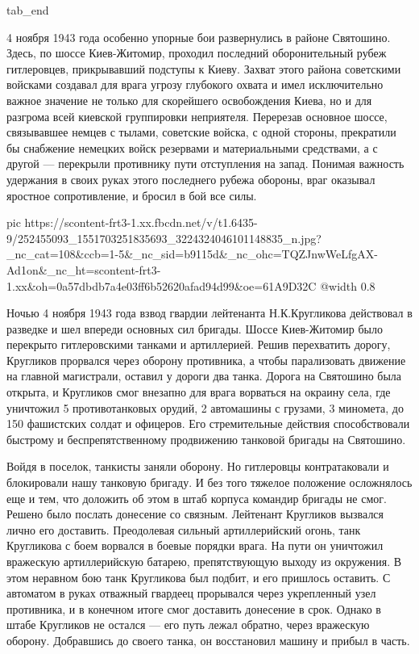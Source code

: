   tab_end
\fi

4 ноября 1943 года особенно упорные бои развернулись в районе Святошино. Здесь,
по шоссе Киев-Житомир, проходил последний оборонительный рубеж гитлеровцев,
прикрывавший подступы к Киеву. Захват этого района советскими войсками создавал
для врага угрозу глубокого охвата и имел исключительно важное значение не
только для скорейшего освобождения Киева, но и для разгрома всей киевской
группировки неприятеля. Перерезав основное шоссе, связывавшее немцев с тылами,
советские войска, с одной стороны, прекратили бы снабжение немецких войск
резервами и материальными средствами, а с другой — перекрыли противнику пути
отступления на запад. Понимая важность удержания в своих руках этого последнего
рубежа обороны, враг оказывал яростное сопротивление, и бросил в бой все силы. 

\ifcmt
     pic https://scontent-frt3-1.xx.fbcdn.net/v/t1.6435-9/252455093_1551703251835693_3224324046101148835_n.jpg?_nc_cat=108&ccb=1-5&_nc_sid=b9115d&_nc_ohc=TQZJnwWeLfgAX-Ad1on&_nc_ht=scontent-frt3-1.xx&oh=0a57dbdb7a4e03ff6b52620afad94d99&oe=61A9D32C
     @width 0.8
\fi

Ночью 4 ноября 1943 года взвод гвардии лейтенанта Н.К.Кругликова действовал в
разведке и шел впереди основных сил бригады. Шоссе Киев-Житомир было перекрыто
гитлеровскими танками и артиллерией. Решив перехватить дорогу, Кругликов
прорвался через оборону противника, а чтобы парализовать движение на главной
магистрали, оставил у дороги два танка. Дорога на Святошино была открыта, и
Кругликов смог внезапно для врага ворваться на окраину села, где уничтожил 5
противотанковых орудий, 2 автомашины с грузами, 3 миномета, до 150 фашистских
солдат и офицеров. Его стремительные действия способствовали быстрому и
беспрепятственному продвижению танковой бригады на Святошино.

Войдя в поселок, танкисты заняли оборону. Но гитлеровцы контратаковали и
блокировали нашу танковую бригаду. И без того тяжелое положение осложнялось еще
и тем, что доложить об этом в штаб корпуса командир бригады не смог. Решено
было послать донесение со связным. Лейтенант Кругликов вызвался лично его
доставить. Преодолевая сильный артиллерийский огонь, танк Кругликова с боем
ворвался в боевые порядки врага. На пути он уничтожил вражескую артиллерийскую
батарею, препятствующую выходу из окружения. В этом неравном бою танк
Кругликова был подбит, и его пришлось оставить. С автоматом в руках отважный
гвардеец прорывался через укрепленный узел противника, и в конечном итоге смог
доставить донесение в срок. Однако в штабе Кругликов не остался — его путь
лежал обратно, через вражескую оборону. Добравшись до своего танка, он
восстановил машину и прибыл в часть.

